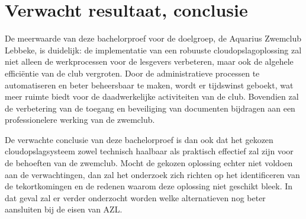 \section{Verwacht resultaat, conclusie}%
\label{sec:verwachte_resultaten}

De meerwaarde van deze bachelorproef voor de doelgroep, de Aquarius Zwemclub Lebbeke, is duidelijk: de implementatie van een robuuste cloudopslagoplossing zal niet alleen de werkprocessen voor de lesgevers verbeteren, maar ook de algehele efficiëntie van de club vergroten. Door de administratieve processen te automatiseren en beter beheersbaar te maken, wordt er tijdswinst geboekt, wat meer ruimte biedt voor de daadwerkelijke activiteiten van de club. Bovendien zal de verbetering van de toegang en beveiliging van documenten bijdragen aan een professionelere werking van de zwemclub.

De verwachte conclusie van deze bachelorproef is dan ook dat het gekozen cloudopslagsysteem zowel technisch haalbaar als praktisch effectief zal zijn voor de behoeften van de zwemclub. Mocht de gekozen oplossing echter niet voldoen aan de verwachtingen, dan zal het onderzoek zich richten op het identificeren van de tekortkomingen en de redenen waarom deze oplossing niet geschikt bleek. In dat geval zal er verder onderzocht worden welke alternatieven nog beter aansluiten bij de eisen van AZL.